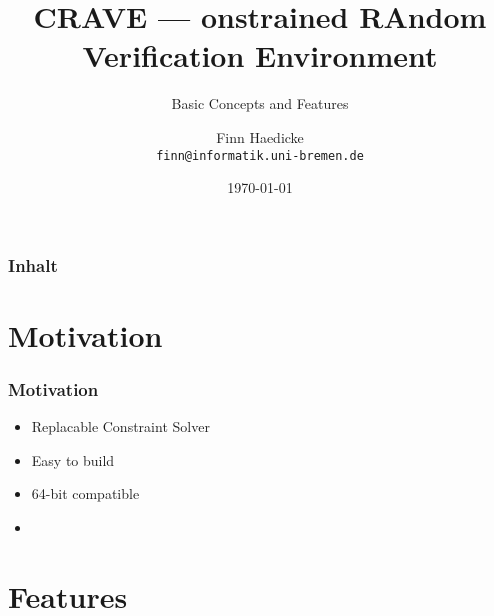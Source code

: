 \documentclass{RAbeamer}
\title[CRAVE]{CRAVE --- onstrained RAndom Verification Environment }
\subtitle{Basic Concepts and Features}
\author[Finn Haedicke] {Finn Haedicke
  \\  \texttt{finn@informatik.uni-bremen.de}
  }
\date{\today}
\institute[Uni-Bremen]{Institute of Computer Science, University of Bremen}
\begin{document}


\begin{frame}
  \titlepage
\end{frame}

\begin{frame}
  \frametitle{Inhalt}
  \tableofcontents
\end{frame}

\section{Motivation}

\begin{frame}
  \frametitle{Motivation}
  \begin{itemize}
    \item Replacable Constraint Solver
    \item Easy to build
    \item 64-bit compatible
  \item 
  \end{itemize}
\end{frame}

\section{Features}
\end{document}

